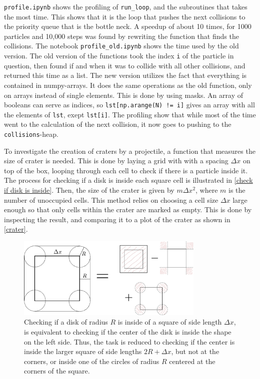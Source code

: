 \documentclass{article}
\begin{document}
    \verb|profile.ipynb| shows the profiling of \verb|run_loop|, and the subroutines that takes the most time.
    This shows that it is the loop that pushes the next collisions to the priority queue that is the bottle neck.
    A speedup of about 10 times, for 1000 particles and 10,000 steps was found by rewriting the function that finds the collisions.
    The notebook \verb|profile_old.ipynb| shows the time used by the old version.
    The old version of the functions took the index \verb|i| of the particle in question, then found if and when it was to collide with all other collisions, and returned this time as a list.
    The new version utilizes the fact that everything is contained in numpy-arrays.
    It does the same operations as the old function, only on arrays instead of single elements.
    This is done by using masks.
    An array of booleans can serve as indices, so \verb|lst[np.arange(N) != i]| gives an array with all the elements of \verb|lst|, exept \verb|lst[i]|.
    The profiling show that while most of the time went to the calculation of the next collision, it now goes to pushing to the \verb|collisions|-heap.

    To investigate the creation of craters by a projectile, a function that measures the size of crater is needed.
    This is done by laying a grid with with a spacing $\Delta x$ on top of the box, looping through each cell to check if there is a particle inside it.
    The process for checking if a disk is inside each square cell is illustrated in \autoref{check if disk is inside}.
    Then, the size of the crater is given by $m \Delta x^2$, where $m$ is the number of unoccupied cells.
    This method relies on choosing a cell size $\Delta x$ large enough so that only cells within the crater are marked as empty.
    This is done by inspecting the result, and comparing it to a plot of the crater as shown in \autoref{crater}.


    \begin{figure}[H]
        \centering
        \includegraphics[width=0.8\textwidth]{figure.pdf}
        \caption{Checking if a disk of radius $R$ is inside of a square of side length $\Delta x$, is equivalent to checking if the center of the disk is inside the shape on the left side.
        Thus, the task is reduced to checking if the center is inside the larger square of side lengths $2R + \Delta x$, but not at the corners, or inside one of the circles of radius $R$ centered at the corners of the square.}
        \label{check if disk is inside}
    \end{figure}
\end{document}
